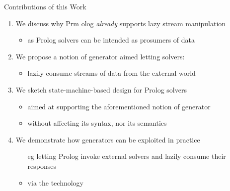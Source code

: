 \documentclass[presentation]{beamer}
\begin{document}
\begin{frame}{Contributions of this Work}

    \begin{enumerate}
        \item We discuss why Prm olog \emph{already} supports lazy stream manipulation
        \begin{itemize}
            \item as Prolog solvers can be intended as \alert{prosumers} of data
        \end{itemize}
        
        \vfill
        
        \item We propose a notion of \alert{generator} aimed letting solvers:
        \begin{itemize}
            \item lazily consume streams of data from the external world
        \end{itemize}

        \vfill  
        
        \item We sketch \alert{state-machine-based} design for Prolog solvers
        \begin{itemize}
            \item aimed at supporting the aforementioned notion of \alert{generator}
            \item without affecting its syntax, nor its semantics
        \end{itemize}

        \vfill  

        \item We demonstrate how generators can be exploited in practice
        \begin{itemize}
            \item[eg] letting Prolog invoke external solvers and lazily consume their responses
            \item via the \twopkt{} technology 
        \end{itemize}
    \end{enumerate}

\end{frame}
\end{document}
